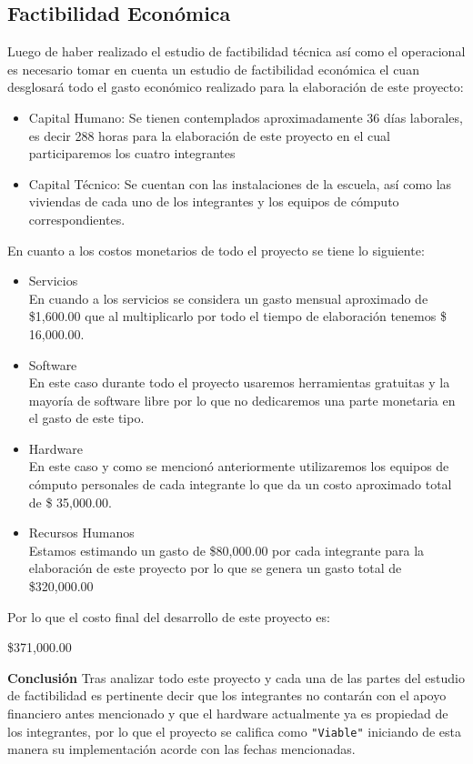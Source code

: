 \documentclass[12pt, a4paper, titlepage]{report}
\begin{document}
    	    \subsection{Factibilidad Económica}
    	    Luego de haber realizado el estudio de factibilidad técnica así como el operacional es necesario tomar en cuenta un estudio de factibilidad económica el cuan desglosará todo el gasto económico realizado para la elaboración de este proyecto:
    	    \begin{itemize}
    	        \item Capital Humano: Se tienen contemplados aproximadamente 36 días laborales, es decir 288 horas para la elaboración de este proyecto en el cual participaremos los cuatro integrantes
    	        \item Capital Técnico: Se cuentan con las instalaciones de la escuela, así como las viviendas de cada uno de los integrantes y los equipos de cómputo correspondientes.
    	    \end{itemize}
    	    En cuanto a los costos monetarios de todo el proyecto se tiene lo siguiente:
    	    \begin{itemize}
    	        \item Servicios\\
    	        En cuando a los servicios se considera un gasto mensual aproximado de \$1,600.00 que al multiplicarlo por todo el tiempo de elaboración tenemos \$ 16,000.00.
    	        \item Software \\
    	        En este caso durante todo el proyecto usaremos herramientas gratuitas y la mayoría de software libre por lo que no dedicaremos una parte monetaria en el gasto de este tipo.
    	        \item Hardware\\
    	        En este caso y como se mencionó anteriormente utilizaremos los equipos de cómputo personales de cada integrante lo que da un costo aproximado total de \$ 35,000.00.
    	        \item Recursos Humanos\\
    	        Estamos estimando un gasto de \$80,000.00 por cada integrante para la elaboración de este proyecto por lo que se genera un gasto total de \$320,000.00
    	    \end{itemize}
    	    Por lo que el costo final del desarrollo de este proyecto es: \\
    	    \begin{center}
    	        \$371,000.00
    	    \end{center}
    	    \textbf{Conclusión} Tras analizar todo este proyecto y cada una de las partes del estudio de factibilidad es pertinente decir que los integrantes no contarán con el apoyo financiero antes mencionado y que el hardware actualmente ya es propiedad de los integrantes, por lo que el proyecto se califica como \texttt{"Viable"} iniciando de esta manera su implementación acorde con las fechas mencionadas.
    	    
\end{document}
